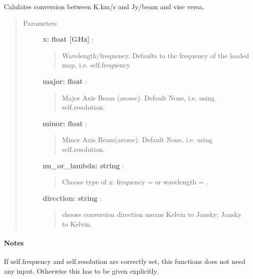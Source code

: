 \documentclass[a4paper,10pt,english]{sphinxmanual}
\begin{document}
\begin{fulllineitems}

\begin{fulllineitems}
\label{maps:astrolyze.maps.main.Map.flux_conversion}
Calulates conversion between K.km/s and Jy/beam and vise versa.
\begin{quote}\begin{description}
\item[{Parameters }] \leavevmode
\textbf{x: float {[}GHz{]}} :
\begin{quote}

Wavelength/frequency. Defaults to the frequency of the loaded map,
i.e. self.frequency
\end{quote}

\textbf{major: float} :
\begin{quote}

Major Axis Beam (arcsec). Default None, i.e. using self.resolution.
\end{quote}

\textbf{minor: float} :
\begin{quote}

Minor Axis Beam(arcsec). Default None, i.e. using self.resolution.
\end{quote}

\textbf{nu\_or\_lambda: string} :
\begin{quote}

Choose type of x: frequency =  or wavelength =
.
\end{quote}

\textbf{direction: string} :
\begin{quote}

choose conversion direction 
means Kelvin to Jansky;  Jansky to Kelvin.
\end{quote}

\end{description}\end{quote}
\paragraph{Notes}

If self.frequency and self.resolution are correctly set, this functions
does not need any input. Otherwise this has to be given explicitly.

\end{fulllineitems}


\end{fulllineitems}
\end{document}

